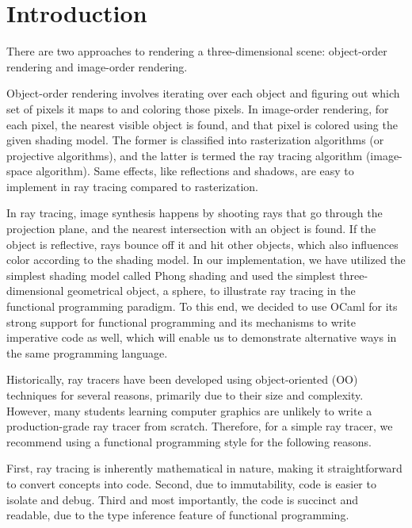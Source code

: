 \documentclass[conference]{IEEEtran}
\begin{document}
\section{Introduction}

There are two approaches to rendering a three-dimensional scene: object-order rendering and image-order rendering. \cite{peter}

Object-order rendering involves iterating over each object and figuring out which set of pixels it maps to and coloring those pixels.
In image-order rendering, for each pixel, the nearest visible object is found, and that pixel is colored using the given shading model. 
The former is classified into rasterization algorithms (or projective algorithms), and the latter is termed the ray tracing algorithm (image-space algorithm). Same effects, like reflections and shadows, are easy to implement in ray tracing compared to rasterization\cite{kevin}.

In ray tracing, image synthesis happens by shooting rays that go through the projection plane, and the nearest intersection with an object is found. If the object is reflective, rays bounce off it and hit other objects, which also influences color according to the shading model\cite{kevin}. In our implementation\cite{mycode}, we have utilized the simplest shading model called Phong shading\cite{peter} and used the simplest three-dimensional geometrical object, a sphere, to illustrate ray tracing in the functional programming paradigm. To this end, we decided to use OCaml for its strong support for functional programming and its mechanisms to write imperative code as well, which will enable us to demonstrate alternative ways in the same programming language.


Historically, ray tracers have been developed using object-oriented (OO) techniques for several reasons, primarily due to their size and complexity. However, many students learning computer graphics are unlikely to write a production-grade ray tracer from scratch. Therefore, for a simple ray tracer, we recommend using a functional programming style for the following reasons.

First, ray tracing is inherently mathematical in nature, making it straightforward to convert concepts into code. Second, due to immutability, code is easier to isolate and debug. Third and most importantly, the code is succinct and readable, due to the type inference feature of functional programming.
\end{document}
